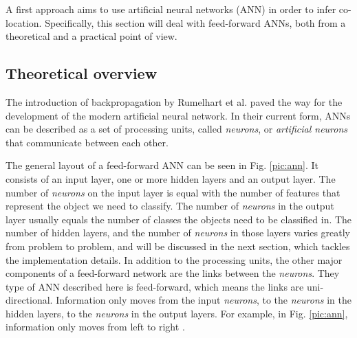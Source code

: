 A first approach aims to use artificial neural networks (ANN) in order to infer co-location. Specifically, this section will deal with feed-forward ANNs, both from a theoretical and a practical point of view. 

\subsection{Theoretical overview}

The introduction of backpropagation by Rumelhart et al. \cite{rumelhart} paved the way for the development of the modern artificial neural network. In their current form, ANNs can be described as a set of processing units, called \textit{neurons}, or \textit{artificial neurons} that communicate between each other. 

The general layout of a feed-forward ANN can be seen in Fig. \ref{pic:ann}. It consists of an input layer, one or more hidden layers and an output layer. The number of \textit{neurons} on the input layer is equal with the number of features that represent the object we need to classify. The number of \textit{neurons} in the output layer usually equals the number of classes the objects need to be classified in. The number of hidden layers, and the number of \textit{neurons} in those layers varies greatly from problem to problem, and will be discussed in the next section, which tackles the implementation details.
In addition to the processing units, the other major components of a feed-forward network are the links between the \textit{neurons}. They type of ANN described here is feed-forward, which means the links are uni-directional. Information only moves from the input \textit{neurons}, to the \textit{neurons} in the hidden layers, to the \textit{neurons} in the output layers. For example, in Fig. \ref{pic:ann}, information only moves from left to right \cite{annintroduction2}.  


